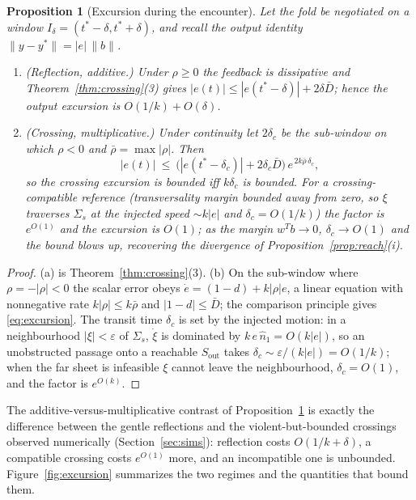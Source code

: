 \documentclass[11pt,american]{article}
\newtheorem{proposition}{Proposition}
\theoremstyle{definition}
\theoremstyle{plain}
\theoremstyle{remark}
\begin{document}
\begin{proposition}[Excursion during the encounter]\label{prop:excursion}
Let the fold be negotiated on a window $I_\delta=(t^*-\delta,t^*+\delta)$, and recall the output identity $\|y-y^*\|=|e|\,\|b\|$.
\begin{enumerate}
\item[(a)] \emph{(Reflection, additive.)} Under $\rho\ge0$ the feedback is dissipative and Theorem~\ref{thm:crossing}(3) gives $|e(t)|\le|e(t^*-\delta)|+2\delta\bar D$; hence the output excursion is $O(1/k)+O(\delta)$.
\item[(b)] \emph{(Crossing, multiplicative.)} Under continuity let $2\delta_c$ be the sub-window on which $\rho<0$ and $\bar\rho=\max|\rho|$. Then
\begin{equation}\label{eq:excursion}
|e(t)|\ \le\ \bigl(|e(t^*-\delta_c)|+2\delta_c\bar D\bigr)\,e^{\,2k\bar\rho\,\delta_c},
\end{equation}
so the crossing excursion is bounded iff $k\delta_c$ is bounded. For a \emph{crossing-compatible} reference (transversality margin bounded away from zero, so $\xi$ traverses $\Sigma_s$ at the injected speed $\sim k|e|$ and $\delta_c=O(1/k)$) the factor is $e^{O(1)}$ and the excursion is $O(1)$; as the margin $w^Tb\to0$, $\delta_c\to O(1)$ and the bound blows up, recovering the divergence of Proposition~\ref{prop:reach}(i).
\end{enumerate}
\end{proposition}

\begin{proof}
(a) is Theorem~\ref{thm:crossing}(3). (b) On the sub-window where $\rho=-|\rho|<0$ the scalar error obeys $\dot e=(1-d)+k|\rho|e$, a linear equation with nonnegative rate $k|\rho|\le k\bar\rho$ and $|1-d|\le\bar D$; the comparison principle gives \eqref{eq:excursion}. The transit time $\delta_c$ is set by the injected motion: in a neighbourhood $|\xi|<\varepsilon$ of $\Sigma_s$, $\dot\xi$ is dominated by $k\,e\,\hat n_1=O(k|e|)$, so an unobstructed passage onto a reachable $S_{\mathrm{out}}$ takes $\delta_c\sim\varepsilon/(k|e|)=O(1/k)$; when the far sheet is infeasible $\xi$ cannot leave the neighbourhood, $\delta_c=O(1)$, and the factor is $e^{O(k)}$.
\end{proof}

The additive-versus-multiplicative contrast of Proposition~\ref{prop:excursion} is exactly the difference between the gentle reflections and the violent-but-bounded crossings observed numerically (Section~\ref{sec:sims}): reflection costs $O(1/k+\delta)$, a compatible crossing costs $e^{O(1)}$ more, and an incompatible one is unbounded. Figure~\ref{fig:excursion} summarizes the two regimes and the quantities that bound them.
\end{document}

